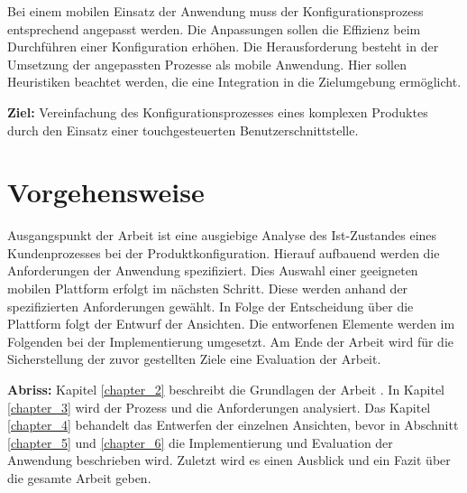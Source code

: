 Bei einem mobilen Einsatz der Anwendung muss der Konfigurationsprozess entsprechend angepasst werden. Die Anpassungen sollen die Effizienz beim Durchführen einer Konfiguration erhöhen. Die Herausforderung besteht in der Umsetzung der angepassten Prozesse als mobile Anwendung. Hier sollen Heuristiken beachtet werden, die eine Integration in die Zielumgebung ermöglicht. 



\begin{mdframed}[backgroundcolor=gray!40,shadow=true,roundcorner=8pt]
\textbf{Ziel:} \newline
Vereinfachung des Konfigurationsprozesses eines komplexen Produktes durch den Einsatz einer touchgesteuerten Benutzerschnittstelle.
\end{mdframed}

\section{Vorgehensweise}
Ausgangspunkt der Arbeit ist eine ausgiebige Analyse des Ist-Zustandes eines Kundenprozesses bei der Produktkonfiguration. Hierauf aufbauend werden die Anforderungen der Anwendung spezifiziert. Dies Auswahl einer geeigneten mobilen Plattform erfolgt im nächsten Schritt. Diese werden anhand der spezifizierten Anforderungen gewählt. In Folge der Entscheidung über die Plattform folgt der Entwurf der Ansichten. Die entworfenen Elemente werden im Folgenden bei der Implementierung umgesetzt. Am Ende der Arbeit wird für die Sicherstellung der zuvor gestellten Ziele eine Evaluation der Arbeit. 
\par
\textbf{Abriss: }
Kapitel \ref{chapter_2} beschreibt die Grundlagen der Arbeit . In Kapitel \ref{chapter_3} wird der Prozess und die Anforderungen analysiert. Das Kapitel \ref{chapter_4} behandelt das Entwerfen der einzelnen Ansichten, bevor in Abschnitt \ref{chapter_5} und \ref{chapter_6} die Implementierung und Evaluation der Anwendung beschrieben wird. Zuletzt wird es einen Ausblick und ein Fazit über die gesamte Arbeit geben.








